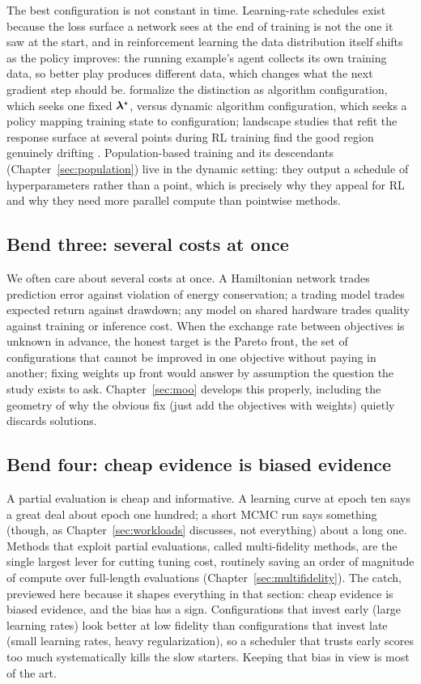 The best configuration is not constant in time.
Learning-rate schedules exist because the loss surface a network sees at the
end of training is not the one it saw at the start, and in reinforcement
learning the data distribution itself shifts as the policy improves: the
running example's agent collects its own training data, so better play
produces different data, which changes what the next gradient step should
be. \citet{eimer2023hyperparameters} formalize the distinction as algorithm
configuration, which seeks one fixed $\bm{\lambda}^{\star}$, versus dynamic
algorithm configuration, which seeks a policy mapping training state to
configuration; landscape studies that refit the response surface at
several points during RL training find the good region genuinely drifting
\citep{mohan2023landscapes}. Population-based training and its descendants
(Chapter~\ref{sec:population}) live in the dynamic setting: they output a
schedule of hyperparameters rather than a point, which is precisely why they
appeal for RL and why they need more parallel compute than pointwise methods.

\subsection{Bend three: several costs at once}

We often care about several costs at once. A Hamiltonian network
trades prediction error against violation of energy conservation; a trading
model trades expected return against drawdown; any model on shared hardware
trades quality against training or inference cost. When the exchange rate
between objectives is unknown in advance, the honest target is the Pareto
front, the set of configurations that cannot be improved in one objective
without paying in another; fixing weights up front would answer by
assumption the question the study exists to ask.
Chapter~\ref{sec:moo} develops this properly,
including the geometry of why the obvious fix (just add the objectives with
weights) quietly discards solutions.

\subsection{Bend four: cheap evidence is biased evidence}

A partial evaluation is cheap and informative. A learning curve at
epoch ten says a great deal about epoch one hundred; a short MCMC run says
something (though, as Chapter~\ref{sec:workloads} discusses, not everything)
about a long one. Methods that exploit partial evaluations, called
multi-fidelity methods, are the single largest lever for cutting tuning cost,
routinely saving an order of magnitude of compute over full-length
evaluations (Chapter~\ref{sec:multifidelity}). The catch, previewed here
because it shapes everything in that section: cheap evidence is biased
evidence, and the bias has a sign. Configurations that invest early (large
learning rates) look better at low fidelity than configurations that invest
late (small learning rates, heavy regularization), so a scheduler that
trusts early scores too much systematically kills the slow starters. Keeping
that bias in view is most of the art.

